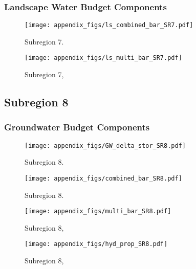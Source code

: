 \subsubsection{Landscape Water Budget Components}
\begin{figure}[ht]
\centerline{\texttt{[image: appendix\_figs/ls\_combined\_bar\_SR7.pdf]}}
\caption{\LSCombinedTextOne Subregion 7.\LSCombinedTextTwo}
\label{fig:LS_budget_SR7}
\end{figure}
\newpage

\begin{landscape}
\begin{figure}[ht]
\centerline{\texttt{[image: appendix\_figs/ls\_multi\_bar\_SR7.pdf]}}
\caption{\LSMultiTextOne Subregion 7,\LSMultiTextTwo}
\label{fig:multi_LS_budget_SR7}
\end{figure}
\newpage
\end{landscape}

\subsection{Subregion 8}
\subsubsection{Groundwater Budget Components}
\begin{figure}[h]
\centerline{\texttt{[image: appendix\_figs/GW\_delta\_stor\_SR8.pdf]}}
\caption{\GWBudgetText Subregion 8.}
\label{fig:delta_stor_SR8}
\end{figure}
\newpage

\begin{figure}[ht]
\centerline{\texttt{[image: appendix\_figs/combined\_bar\_SR8.pdf]}}
\caption{\GWCombinedTextOne Subregion 8.\GWCombinedTextTwo}
\label{fig:GW_budget_SR8}
\end{figure}
\newpage

\begin{landscape}
\begin{figure}[ht]
\centerline{\texttt{[image: appendix\_figs/multi\_bar\_SR8.pdf]}}
\caption{\GWMultiTextOne Subregion 8,\GWMultiTextTwo}
\label{fig:multi_GW_budget_SR8}
\end{figure}
\newpage

\begin{figure}[ht]
\centerline{\texttt{[image: appendix\_figs/hyd\_prop\_SR8.pdf]}}
\caption{\HydPropOne Subregion 8,\HydPropTwo}
\label{fig:hyd_prop_SR8}
\end{figure}
\newpage
\end{landscape}

